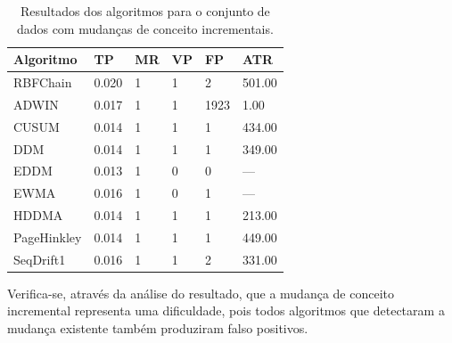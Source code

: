 \documentclass[msc, classic, a4paper]{ufbathesis}
\begin{document}
\begin{table}[ht]
\centering
\caption{Resultados dos algoritmos para o conjunto de dados com mudanças de conceito incrementais.}
\label{tbl:exp4}
\begin{tabular}{llllll}

\toprule
Algoritmo              & TP                     & MR                     & VP                     & FP                     & ATR                    \\ 
\midrule
RBFChain               & 0.020                  & 1                      & 1                      & 2                      & 501.00                 \\ 
ADWIN                  & 0.017                  & 1                      & 1                      & 1923                   & 1.00                   \\ 
CUSUM                  & 0.014                  & 1                      & 1                      & 1                      & 434.00                 \\ 
DDM                    & 0.014                  & 1                      & 1                      & 1                      & 349.00                 \\ 
EDDM                   & 0.013                  & 1                      & 0                      & 0                      & ---                    \\ 
EWMA                   & 0.016                  & 1                      & 0                      & 1                      & ---                    \\ 
HDDMA                  & 0.014                  & 1                      & 1                      & 1                      & 213.00                    \\ 
PageHinkley            & 0.014                  & 1                      & 1                      & 1                      & 449.00                 \\ 
SeqDrift1              & 0.016                  & 1                      & 1                      & 2                      & 331.00                 \\ 
\bottomrule

\end{tabular}
\end{table}

Verifica-se, através da análise do resultado, que a mudança de conceito incremental representa uma dificuldade, pois todos algoritmos que detectaram a mudança existente também produziram falso positivos.
\end{document}
